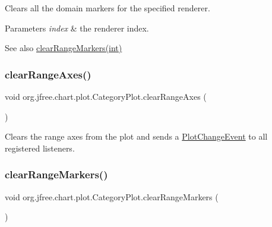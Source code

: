 Clears all the domain markers for the specified renderer.


\begin{DoxyParams}{Parameters}
{\em index} & the renderer index.\\
\hline
\end{DoxyParams}
\begin{DoxySeeAlso}{See also}
\mbox{\hyperlink{classorg_1_1jfree_1_1chart_1_1plot_1_1_category_plot_a2bf4600bbed1d743d9975c18b038c29e}{clear\+Range\+Markers(int)}} 
\end{DoxySeeAlso}
\mbox{\label{classorg_1_1jfree_1_1chart_1_1plot_1_1_category_plot_ad934793e2dd46b04dd78d061e81054f5}} 
\subsubsection{\texorpdfstring{clear\+Range\+Axes()}{clearRangeAxes()}}
{\footnotesize\ttfamily void org.\+jfree.\+chart.\+plot.\+Category\+Plot.\+clear\+Range\+Axes (\begin{DoxyParamCaption}{ }\end{DoxyParamCaption})}

Clears the range axes from the plot and sends a \mbox{\hyperlink{}{Plot\+Change\+Event}} to all registered listeners. \mbox{\label{classorg_1_1jfree_1_1chart_1_1plot_1_1_category_plot_a8d328087c6f781c211f40c6af8af6025}} 
\subsubsection{\texorpdfstring{clear\+Range\+Markers()}{clearRangeMarkers()}\hspace{0.1cm}{\footnotesize\ttfamily [1/2]}}
{\footnotesize\ttfamily void org.\+jfree.\+chart.\+plot.\+Category\+Plot.\+clear\+Range\+Markers (\begin{DoxyParamCaption}{ }\end{DoxyParamCaption})}

